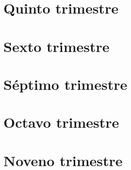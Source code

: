 \documentclass[
	12pt,
	fleqn,
	twosides,
]{book}
\begin{document}
\part{Quinto trimestre}



% 





\part{Sexto trimestre}









\part{Séptimo trimestre}









\part{Octavo trimestre}











\part{Noveno trimestre}
\end{document}
